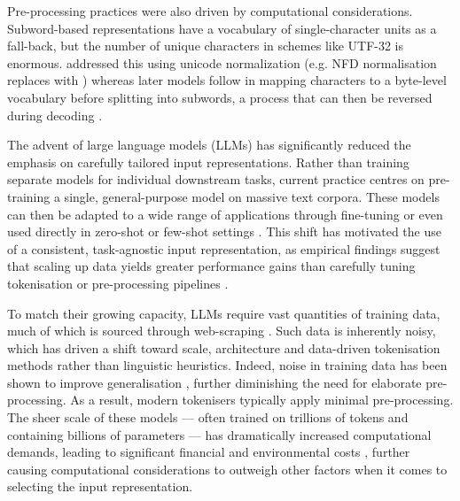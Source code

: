 Pre-processing practices were also driven by computational considerations. Subword-based representations have a vocabulary of single-character units as a fall-back, but the number of unique characters in schemes like UTF-32 is enormous. \bert addressed this using unicode normalization (e.g. NFD normalisation replaces  with ) whereas later models follow \gpt \citep{radford-2019-gpt2} in mapping characters to a byte-level vocabulary before splitting into subwords, a process that can then be reversed during decoding \citep{wang2020neural}.  

The advent of large language models (LLMs) has significantly reduced the emphasis on carefully tailored input representations. Rather than training separate models for individual downstream tasks, current practice centres on pre-training a single, general-purpose model on massive text corpora. These models can then be adapted to a wide range of applications through fine-tuning or even used directly in zero-shot or few-shot settings \citep{raffel2020exploring}. This shift has motivated the use of a consistent, task-agnostic input representation, as empirical findings suggest that scaling up data yields greater performance gains than carefully tuning tokenisation or pre-processing pipelines \citep{brown-2020-gpt3}. 

To match their growing capacity, LLMs require vast quantities of training data, much of which is sourced through web-scraping \citep{bansal-2022-datascaling}. Such data is inherently noisy, which has driven a shift toward scale, architecture and data-driven tokenisation methods rather than linguistic heuristics. Indeed, noise in training data has been shown to improve generalisation \citep{zheng-saparov-2023-noisy}, further diminishing the need for elaborate pre-processing. As a result, modern tokenisers typically apply minimal pre-processing. The sheer scale of these models --- often trained on trillions of tokens and containing billions of parameters --- has dramatically increased computational demands, leading to significant financial and environmental costs \citep{strubell-etal-2019-energy, patterson2021carbonemissionslargeneural, bender2021parrots, luccioni2022estimatingcarbonfootprintbloom}, further causing computational considerations to outweigh other factors when it comes to selecting the input representation. 


